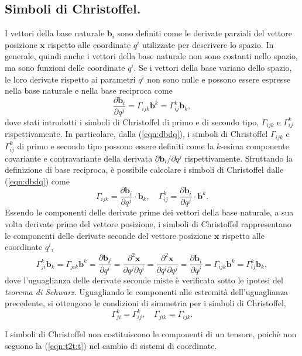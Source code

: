  \subsection{Simboli di Christoffel.} 
I vettori della base naturale $\bm{b}_i$ sono definiti come le derivate parziali del vettore posizione $\bm{x}$ rispetto alle coordinate $q^i$ utilizzate per descrivere lo spazio. In generale, quindi anche i vettori della base naturale non sono costanti nello spazio, ma sono funzioni delle coordinate $q^i$. Se i vettori della base variano dello spazio, le loro derivate rispetto ai parametri $q^i$ non sono nulle e possono essere espresse nella base naturale e nella base reciproca come
\begin{equation}\label{eqn:dbdq}
 \dfrac{\partial \bm{b}_i}{\partial q^j} = \Gamma_{ijk} \bm{b}^k = \Gamma_{ij}^k \bm{b}_k ,
\end{equation}
 dove stati introdotti i simboli di Christoffel di primo e di secondo tipo, $\Gamma_{ijk}$ e $\Gamma^{k}_{ij}$ rispettivamente. In particolare, dalla (\ref{eqn:dbdq}), i simboli di Christoffel $\Gamma_{ijk}$ e $\Gamma^{k}_{ij}$ di primo e secondo tipo possono essere definiti come la $k$-esima componente covariante e contravariante della derivata $\partial \bm{b}_i/\partial q^j$ rispettivamente. Sfruttando la definizione di base reciproca, è possibile calcolare i simboli di Christoffel dalle (\ref{eqn:dbdq}) come
\begin{equation}
  \Gamma_{ijk} = \dfrac{\partial \bm{b}_i}{\partial q^j} \cdot \bm{b}_k , \quad
  \Gamma^{k}_{ij} = \dfrac{\partial \bm{b}_i}{\partial q^j} \cdot \bm{b}^k .
\end{equation}
Essendo le componenti delle derivate prime dei vettori della base naturale, a sua volta derivate prime del vettore posizione, i simboli di Christoffel rappresentano le componenti delle derivate seconde del vettore posizione $\bm{x}$ rispetto alle coordinate $q^i$,
\begin{equation}
 \Gamma_{ji}^k \bm{b}_k = \Gamma_{jik} \bm{b}^k =
 \dfrac{\partial \bm{b}_j}{\partial q^i} =\dfrac{\partial^2 \bm{x}}{\partial q^j \partial q^i} =
 \dfrac{\partial^2 \bm{x}}{\partial q^i \partial q^j} = \dfrac{\partial \bm{b}_i}{\partial q^j} = \Gamma_{ijk} \bm{b}^k = \Gamma_{ij}^k \bm{b}_k ,
\end{equation}
dove l'uguaglianza delle derivate seconde miste è verificata sotto le ipotesi del \textit{teorema di Schwarz}. Uguagliando le componenti alle estremità dell'uguaglianza precedente, si ottengono le condizioni di simmetria per i simboli di Christoffel,
\begin{equation}
 \Gamma_{ji}^k = \Gamma_{ij}^k , \quad \Gamma_{jik} =  \Gamma_{ijk} .
\end{equation}
\begin{remark}
 I simboli di Christoffel non costituiscono le componenti di un tensore, poichè non seguono la (\ref{eqn:t2t:t}) nel cambio di sistemi di coordinate.
\end{remark}

